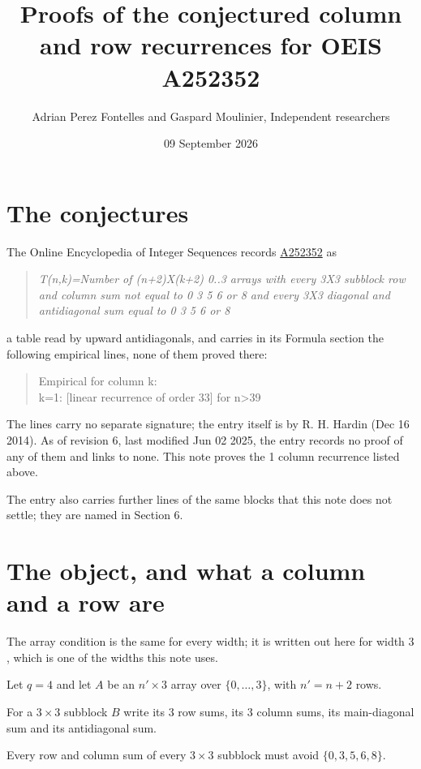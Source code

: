 \documentclass[11pt]{article}
\title{Proofs of the conjectured column and row recurrences for OEIS A252352}
\author{Adrian Perez Fontelles and Gaspard Moulinier, Independent researchers}
\date{09 September 2026}
\theoremstyle{definition}
\begin{document}
\maketitle
\section{The conjectures}

The Online Encyclopedia of Integer Sequences records \href{https://oeis.org/A252352}{A252352} as

\begin{quote}\itshape T(n,k)=Number of (n+2)X(k+2) 0..3 arrays with every 3X3 subblock row and column sum not equal to 0 3 5 6 or 8 and every 3X3 diagonal and antidiagonal sum equal to 0 3 5 6 or 8\end{quote}

a table read by upward antidiagonals, and carries in its Formula section the following empirical lines, none of them proved there:

\begin{quote}\ttfamily Empirical for column k:\\
k=1: [linear recurrence of order 33] for n>39\end{quote}

The lines carry no separate signature; the entry itself is by R. H. Hardin (Dec 16 2014). As of revision 6, last modified Jun 02 2025, the entry records no proof of any of them and links to none. This note proves the 1 column recurrence listed above.

The entry also carries further lines of the same blocks that this note does not settle; they are named in Section 6.

\section{The object, and what a column and a row are}

The array condition is the same for every width; it is written out here for width $3$, which is one of the widths this note uses.

Let $q = 4$ and let $A$ be an $n' \times 3$ array over $\{0,\dots,3\}$, with $n' = n + 2$ rows.

For a $3\times3$ subblock $B$ write its 3 row sums, its 3 column sums, its main-diagonal sum and its antidiagonal sum.

Every row and column sum of every $3\times3$ subblock must avoid $\{0, 3, 5, 6, 8\}$.
\end{document}
